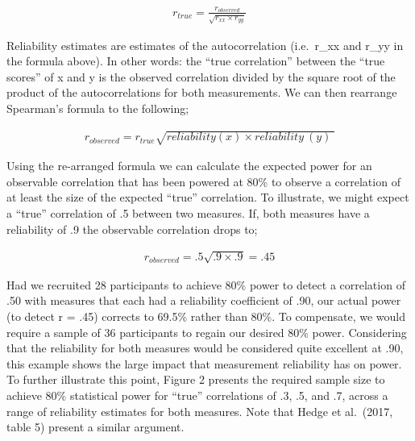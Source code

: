 \documentclass[english,,man,floatsintext]{apa6}
\begin{document}
\begin{align}
r_{true}=\frac{r_{observed}}{\sqrt{r_{xx} \times r_{yy}}}
\end{align}

Reliability estimates are estimates of the autocorrelation (i.e.~r\_xx and r\_yy in the formula above). In other words: the \enquote{true correlation} between the \enquote{true scores} of x and y is the observed correlation divided by the square root of the product of the autocorrelations for both measurements. We can then rearrange Spearman's formula to the following;

\begin{align}
r_{observed}=r_{true} \sqrt{reliability(x) \times reliability ~(y) ~}
\end{align}

Using the re-arranged formula we can calculate the expected power for an observable correlation that has been powered at 80\% to observe a correlation of at least the size of the expected \enquote{true} correlation. To illustrate, we might expect a \enquote{true} correlation of .5 between two measures. If, both measures have a reliability of .9 the observable correlation drops to;

\begin{align}
r_{observed}=.5 \sqrt{.9 \times .9}=.45
\end{align}

Had we recruited 28 participants to achieve 80\% power to detect a correlation of .50 with measures that each had a reliability coefficient of .90, our actual power (to detect r = .45) corrects to 69.5\% rather than 80\%. To compensate, we would require a sample of 36 participants to regain our desired 80\% power. Considering that the reliability for both measures would be considered quite excellent at .90, this example shows the large impact that measurement reliability has on power. To further illustrate this point, Figure 2 presents the required sample size to achieve 80\% statistical power for \enquote{true} correlations of .3, .5, and .7, across a range of reliability estimates for both measures. Note that Hedge et al.~(2017, table 5) present a similar argument.
\end{document}
